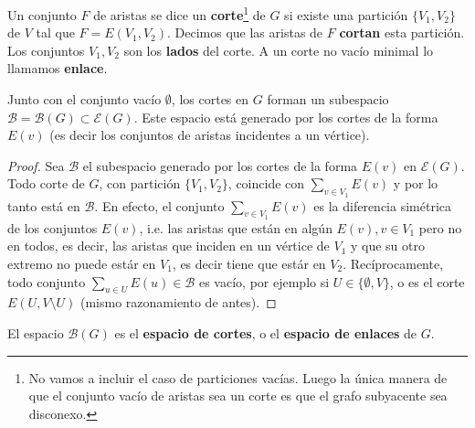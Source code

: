 \documentclass[../main.tex]{subfiles}
\begin{document}
\begin{definition}
Un conjunto $F$ de aristas se dice un \textbf{corte}\footnote{No vamos a incluir el caso de particiones vacías. Luego la única manera de que el conjunto vacío de aristas sea un corte es que el grafo subyacente sea disconexo.}
 de $G$ si existe una partición $\{V_1,V_2\}$ de $V$ tal que $F = E(V_1,V_2)$. Decimos que las aristas de $F$ \textbf{cortan} esta partición. Los conjuntos $V_1,V_2$ son los \textbf{lados} del corte. A un corte no vacío minimal lo llamamos \textbf{enlace}.
\end{definition}

\begin{proposition}
Junto con el conjunto vacío $\emptyset$, los cortes en $G$ forman un subespacio $\mathcal B = \mathcal B ( G) \subset \mathcal{E}(G)$. Este espacio está generado por los cortes de la forma $E(v)$ (es decir los conjuntos de aristas incidentes a un vértice).
\end{proposition}
\begin{proof}
Sea $\mathcal B$ el subespacio generado por los cortes de la forma $E(v)$ en $\mathcal{E} (G)$. Todo corte de $G$, con partición $\{ V_1 , V_2 \}$, coincide con $\sum_{v \in V_1} E(v)$ y por lo tanto está en $\mathcal{B}$. En efecto, el conjunto $\sum_{v \in V_1} E(v)$ es la diferencia simétrica de los conjuntos $E(v)$, i.e. las aristas que están en algún $E(v), v  \in V_1$ pero no en todos, es decir, las aristas que inciden en un vértice de $V_1$ y que su otro extremo no puede estár en $V_1$, es decir tiene que estár en $V_2$. Recíprocamente, todo conjunto $\sum_{u \in U}E(u) \in \mathcal{B}$ es vacío, por ejemplo si $U \in \{ \emptyset , V \}$, o es el corte $E(U, V \setminus U)$ (mismo razonamiento de antes).
\end{proof}

\begin{definition}
El espacio $\mathcal{B} (G)$ es el \textbf{espacio de cortes}, o el \textbf{espacio de enlaces} de $G$.
\end{definition}
\end{document}
